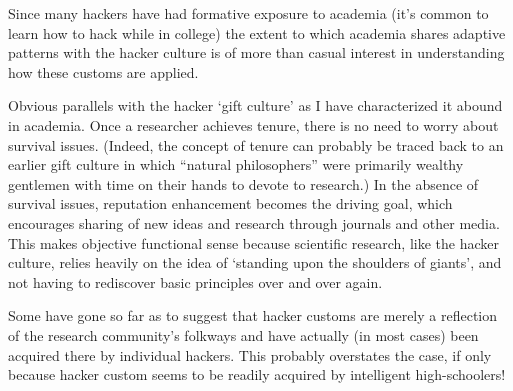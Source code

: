 Since many hackers have had formative exposure to academia (it's common to learn
how to hack while in college) the extent to which academia shares adaptive
patterns with the hacker culture is of more than casual interest in
understanding how these customs are applied.

Obvious parallels with the hacker `gift culture' as I have characterized it
abound in academia.  Once a researcher achieves tenure, there is no need to
worry about survival issues.  (Indeed, the concept of tenure can probably be
traced back to an earlier gift culture in which ``natural philosophers'' were
primarily wealthy gentlemen with time on their hands to devote to research.) In
the absence of survival issues, reputation enhancement becomes the driving goal,
which encourages sharing of new ideas and research through journals and other
media.  This makes objective functional sense because scientific research, like
the hacker culture, relies heavily on the idea of `standing upon the shoulders
of giants', and not having to rediscover basic principles over and over again.

Some have gone so far as to suggest that hacker customs are merely a reflection
of the research community's folkways and have actually (in most cases) been
acquired there by individual hackers.  This probably overstates the case, if
only because hacker custom seems to be readily acquired by intelligent
high-schoolers!
